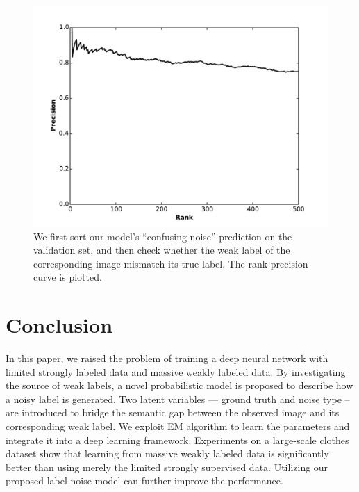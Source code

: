 \documentclass[10pt,twocolumn,letterpaper]{article}
\begin{document}
\begin{figure}[t]
\begin{center}
\includegraphics[width=0.8\linewidth]{figure/noise_prediction_rank_precision.pdf}
\end{center}
\caption{We first sort our model's ``confusing noise'' prediction on the validation set, and then check whether the weak label of the corresponding image mismatch its true label. The rank-precision curve is plotted.}
\label{fig:noise_prediction_rp}
\end{figure}

\section{Conclusion} %
\label{sec:conclusion}
In this paper, we raised the problem of training a deep neural network with limited strongly labeled data and massive weakly labeled data. By investigating the source of weak labels, a novel probabilistic model is proposed to describe how a noisy label is generated. Two latent variables --- ground truth and noise type -- are introduced to bridge the semantic gap between the observed image and its corresponding weak label. We exploit EM algorithm to learn the parameters and integrate it into a deep learning framework. Experiments on a large-scale clothes dataset show that learning from massive weakly labeled data is significantly better than using merely the limited strongly supervised data. Utilizing our proposed label noise model can further improve the performance.

{\small


}
\end{document}
